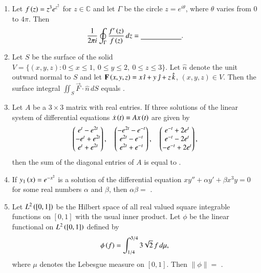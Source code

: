 \documentclass[journal,12pt,onecolumn]{IEEEtran}
\theoremstyle{remark}
\begin{document}
\begin{enumerate}[start=10]
\item Let $f\left(z\right) = z^{3} e^{z^{2}}$ for $z \in \mathbb{C}$ and let $\Gamma$ be the circle $z = e^{i\theta}$, where $\theta$ varies from $0$ to $4\pi$. Then
\begin{align*}
\frac{1}{2\pi i}\oint_{\Gamma} \frac{f'\left(z\right)}{f\left(z\right)}\, dz = \underline{\hspace{2cm}}.
\end{align*}


\hfill{}

\item Let $S$ be the surface of the solid $V = \{(x, y, z) \colon 0 \le x \le 1,\ 0 \le y \le 2,\ 0 \le z \le 3\}$. Let $\hat{n}$ denote the unit
outward normal to $S$ and let $\mathbf{F}\left(x, y, z\right) = x\,\hat{\imath} + y\,\hat{\jmath} + z\,\hat{k}$, $(x, y, z) \in V$. Then the surface integral
$\iint_{S} \vec{F} \cdot \hat{n}\, dS$ equals \underline{\hspace{2cm}}.

\hfill{}
\newpage
\item Let $A$ be a $3\times 3$ matrix with real entries. If three solutions of the linear system of differential
equations $\dot{x}\left(t\right) = A x\left(t\right)$ are given by
\begin{align*}
\begin{pmatrix} e^{t} - e^{2t} \\ -e^{t} + e^{2t} \\ e^{t} + e^{2t} \end{pmatrix},\quad
\begin{pmatrix} -e^{2t} - e^{-t} \\ e^{2t} - e^{-t} \\ e^{2t} + e^{-t} \end{pmatrix},\quad
\begin{pmatrix} e^{-t} + 2e^{t} \\ e^{-t} - 2e^{t} \\ -e^{-t} + 2e^{t} \end{pmatrix},
\end{align*}
then the sum of the diagonal entries of $A$ is equal to \underline{\hspace{2cm}}. 

\hfill{}

\item If $y_1\left(x\right) = e^{-x^{2}}$ is a solution of the differential equation $x y'' + \alpha y' + \beta x^{3} y = 0$ for some real numbers
$\alpha$ and $\beta$, then $\alpha\beta = $ \underline{\hspace{2cm}}.

\hfill{}

\item Let $L^{2}\left([0, 1]\right)$ be the Hilbert space of all real valued square integrable functions on $[0, 1]$ with
the usual inner product. Let $\phi$ be the linear functional on $L^{2}\left([0, 1]\right)$ defined by
\begin{align*}
\phi\left(f\right) = \int_{1/4}^{3/4} {3}{\sqrt{2}}\, f\, d\mu,
\end{align*}
where $\mu$ denotes the Lebesgue measure on $[0, 1]$. Then $\|\phi\| = $ \underline{\hspace{2cm}}.


\end{enumerate}
\end{document}
